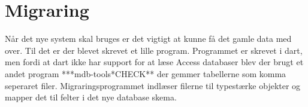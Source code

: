 \section{Migraring}

Når det nye system skal bruges er det vigtigt at kunne få det gamle data med over. Til det er der blevet skrevet et lille program. Programmet er skrevet i dart, men fordi at dart ikke har support for at læse Access databaser blev der brugt et andet program ***mdb-tools*CHECK** der gemmer tabellerne som komma seperaret filer. Migraringsprogrammet indlæser filerne til typestærke objekter og mapper det til felter i det nye database skema.